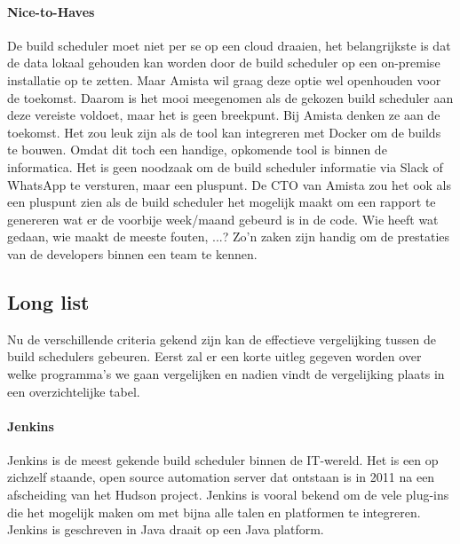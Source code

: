             
            \paragraph{Nice-to-Haves}
            De build scheduler moet niet per se op een cloud draaien, het belangrijkste is dat de data lokaal gehouden kan worden door de build scheduler op een on-premise installatie op te zetten. Maar Amista wil graag deze optie wel openhouden voor de toekomst. Daarom is het mooi meegenomen als de gekozen build scheduler aan deze vereiste voldoet, maar het is geen breekpunt.
            Bij Amista denken ze aan de toekomst. Het zou leuk zijn als de tool kan integreren met Docker om de builds te bouwen. Omdat dit toch een handige, opkomende tool is binnen de informatica.
            Het is geen noodzaak om de build scheduler informatie via Slack of WhatsApp te versturen, maar een pluspunt.
            De CTO van Amista zou het ook als een pluspunt zien als de build scheduler het mogelijk maakt om een rapport te genereren wat er de voorbije week/maand gebeurd is in de code. Wie heeft wat gedaan, wie maakt de meeste fouten, ...? Zo'n zaken zijn handig om de prestaties van de developers binnen een team te kennen.

        \subsection{Long list}
        \label{subsec:Long-list}
        Nu de verschillende criteria gekend zijn kan de effectieve vergelijking tussen de build schedulers gebeuren.
        Eerst zal er een korte uitleg gegeven worden over welke programma's we gaan vergelijken en nadien vindt de vergelijking plaats in een overzichtelijke tabel.

            
            \paragraph{Jenkins}
            Jenkins is de meest gekende build scheduler binnen de IT-wereld. Het is een op zichzelf staande, open source automation server dat ontstaan is in 2011 na een afscheiding van het Hudson project. Jenkins is vooral bekend om de vele plug-ins die het mogelijk maken om met bijna alle talen en platformen te integreren. Jenkins is geschreven in Java draait op een Java platform.
            
